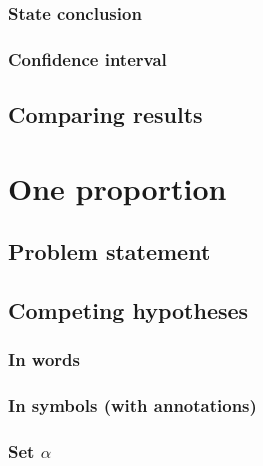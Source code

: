 \documentclass[
  12pt, krantz2,
]{krantz}
\begin{document}
\hypertarget{state-conclusion}{%
\subsubsection*{State conclusion}\label{state-conclusion}}


\hypertarget{confidence-interval}{%
\subsubsection*{Confidence interval}\label{confidence-interval}}


\hypertarget{comparing-results}{%
\subsection{Comparing results}\label{comparing-results}}

\hypertarget{one-proportion}{%
\section{One proportion}\label{one-proportion}}

\hypertarget{problem-statement-1}{%
\subsection{Problem statement}\label{problem-statement-1}}

\hypertarget{competing-hypotheses-1}{%
\subsection{Competing hypotheses}\label{competing-hypotheses-1}}

\hypertarget{in-words-1}{%
\subsubsection*{In words}\label{in-words-1}}


\hypertarget{in-symbols-with-annotations-1}{%
\subsubsection*{In symbols (with annotations)}\label{in-symbols-with-annotations-1}}


\hypertarget{set-alpha-1}{%
\subsubsection*{\texorpdfstring{Set \(\alpha\)}{Set \textbackslash alpha}}\label{set-alpha-1}}
\end{document}
